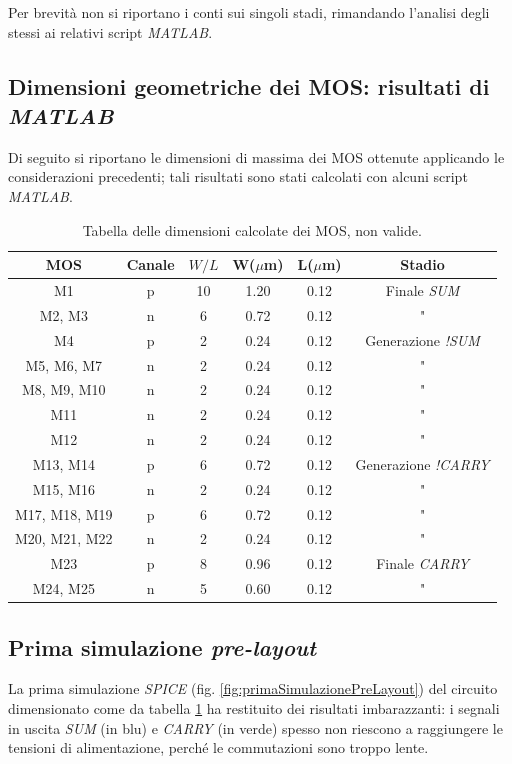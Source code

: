 Per brevità non si riportano i conti sui singoli stadi, rimandando l'analisi degli stessi ai relativi script \textit{MATLAB}.

\subsection{Dimensioni geometriche dei MOS: risultati di \textit{MATLAB}}

Di seguito si riportano le dimensioni di massima dei MOS ottenute applicando le considerazioni precedenti; tali risultati sono stati calcolati con alcuni script \textit{MATLAB}.

\begin{table}[htb]
	\centering
	\begin{tabular}{c*{5}{c}}
		\toprule
		MOS & Canale & $W/L$ & W($\mu$m) & L($\mu$m) & Stadio\\
		\midrule
		M1 & p & 10 & 1.20 & 0.12 & Finale \textit{SUM} \\
		M2, M3 & n & 6 & 0.72 & 0.12 & " \\
		M4 & p & 2 & 0.24 & 0.12 & Generazione \textit{!SUM} \\
		M5, M6, M7 & n & 2 & 0.24 & 0.12 & " \\
		M8, M9, M10 & n & 2 & 0.24 & 0.12 & " \\
		M11 & n & 2 & 0.24 & 0.12 & " \\
		M12 & n & 2 & 0.24 & 0.12 & " \\
		M13, M14 & p & 6 & 0.72 & 0.12 & Generazione \textit{!CARRY} \\
		M15, M16 & n & 2 & 0.24 & 0.12 & " \\
		M17, M18, M19 & p & 6 & 0.72 & 0.12 & " \\
		M20, M21, M22 & n & 2 & 0.24 & 0.12 & " \\
		M23 & p & 8 & 0.96 & 0.12 & Finale \textit{CARRY} \\
		M24, M25 & n & 5 & 0.60 & 0.12 & " \\
		\bottomrule
	\end{tabular}
	\caption{Tabella delle dimensioni calcolate dei MOS, non valide.}
	\label{tab:dimensioniMosTeoriche}
\end{table}

\subsection{Prima simulazione \textit{pre-layout}}
La prima simulazione \textit{SPICE} (fig. \ref{fig:primaSimulazionePreLayout}) del circuito dimensionato come da tabella \ref{tab:dimensioniMosTeoriche} ha restituito dei risultati imbarazzanti: i segnali in uscita \textit{SUM} (in blu) e \textit{CARRY} (in verde) spesso non riescono a raggiungere le tensioni di alimentazione, perché le commutazioni sono troppo lente.

